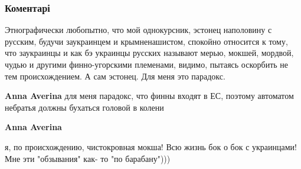  
 
 
 
 
\subsubsection{Коментарі}

\begin{itemize}
 
Этнографически любопытно, что мой однокурсник, эстонец наполовину с русским,
будучи заукраинцем и крымненашистом, спокойно относится к тому, что заукраинцы
и как бэ украинцы русских называют мерью, мокшей, мордвой, чудью и другими
финно-угорскими племенами, видимо, пытаясь оскорбить не тем происхождением. А
сам эстонец. Для меня это парадокс.



\begin{itemize}
 
\textbf{Anna Averina} для меня парадокс, что финны входят в ЕС, поэтому автоматом небратья должны бухаться головой в колени

 
\textbf{Anna Averina} 

я, по происхождению, чистокровная мокша! Всю жизнь бок о бок с украинцами! Мне
эти "обзывания" как- то "по барабану")))

 

\end{itemize}
\end{itemize}
